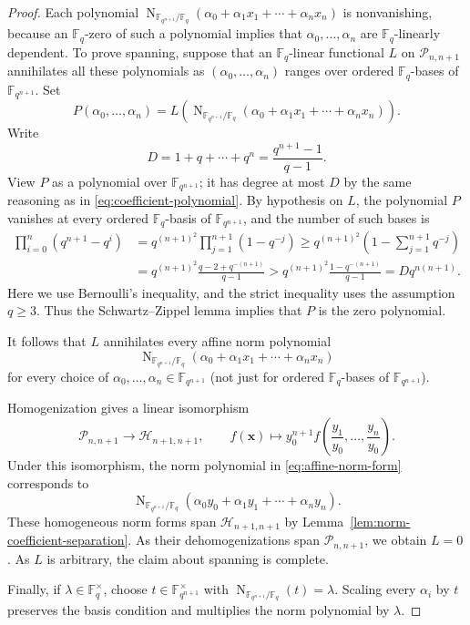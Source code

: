 \documentclass[12pt,reqno]{amsart}
\theoremstyle{definition}
\newcommand{\Nm}{\operatorname{N}}
\newcommand{\F}{\mathbb{F}}
\newcommand{\cH}{\mathcal H}
\newcommand{\cP}{\mathcal P}
\begin{document}
\begin{proof}
Each polynomial $\Nm_{\F_{q^{n+1}}/\F_q}(\alpha_0+\alpha_1x_1+\cdots+\alpha_nx_n)$ is nonvanishing, because an $\F_{q}$-zero of such a polynomial implies that $\alpha_0, \ldots, \alpha_n$ are $\F_q$-linearly dependent. To prove spanning, suppose that an $\F_q$-linear functional $L$ on $\cP_{n,n+1}$ annihilates all these polynomials as $(\alpha_0,\ldots,\alpha_n)$ ranges over ordered
$\F_q$-bases of $\F_{q^{n+1}}$. Set
\[
  P(\alpha_0,\ldots,\alpha_n)
  =L\left(\Nm_{\F_{q^{n+1}}/\F_q}
     (\alpha_0+\alpha_1x_1+\cdots+\alpha_nx_n)\right).
\]
Write
\[
D=1+q+\cdots+q^n=\frac{q^{n+1}-1}{q-1}.
\]
View $P$ as a polynomial over $\F_{q^{n+1}}$; it has degree at most $D$ by the same reasoning as in \eqref{eq:coefficient-polynomial}. By hypothesis on $L$, the polynomial $P$ vanishes at every ordered $\F_q$-basis of
$\F_{q^{n+1}}$, and the number of such bases is
\[
\begin{aligned}
  \prod_{i=0}^{n}(q^{n+1}-q^i)
  &=q^{(n+1)^2}\prod_{j=1}^{n+1}(1-q^{-j})\geq
    q^{(n+1)^2}\left(1-\sum_{j=1}^{n+1}q^{-j}\right)\\
  &=q^{(n+1)^2}\frac{q-2+q^{-(n+1)}}{q-1}>q^{(n+1)^2}\frac{1-q^{-(n+1)}}{q-1}
   =Dq^{n(n+1)}.
\end{aligned}
\]
Here we use Bernoulli's inequality, and the strict inequality uses the assumption $q\geq3$. Thus the Schwartz--Zippel lemma \cite{S80} implies that $P$ is the zero polynomial.

It follows that $L$ annihilates every affine norm polynomial
\begin{equation}\label{eq:affine-norm-form}
\Nm_{\F_{q^{n+1}}/\F_q}
(\alpha_0+\alpha_1x_1+\cdots+\alpha_nx_n)
\end{equation}
for every choice of $\alpha_0,\ldots,\alpha_n\in\F_{q^{n+1}}$ (not just for ordered $\F_q$-bases of $\F_{q^{n+1}}$).

Homogenization gives a linear isomorphism
\[
  \cP_{n,n+1}\to\cH_{n+1,n+1},
  \qquad
  f(\mathbf x)\mapsto
  y_0^{n+1}f\!\left(\frac{y_1}{y_0},\ldots,
                     \frac{y_n}{y_0}\right).
\]
Under this isomorphism, the norm polynomial in \eqref{eq:affine-norm-form} corresponds to
\[
  \Nm_{\F_{q^{n+1}}/\F_q}  (\alpha_0y_0+\alpha_1y_1+\cdots+\alpha_ny_n).
\]
These homogeneous norm forms span $\cH_{n+1,n+1}$ by
Lemma~\ref{lem:norm-coefficient-separation}. As their
dehomogenizations span $\cP_{n,n+1}$, we obtain $L=0$. As $L$ is arbitrary, the claim about spanning is complete. 

Finally, if $\lambda\in\F_q^\times$, choose
$t\in\F_{q^{n+1}}^\times$ with
$\Nm_{\F_{q^{n+1}}/\F_q}(t)=\lambda$. Scaling every $\alpha_i$ by
$t$ preserves the basis condition and multiplies the norm polynomial
by $\lambda$.
\end{proof}
\end{document}
